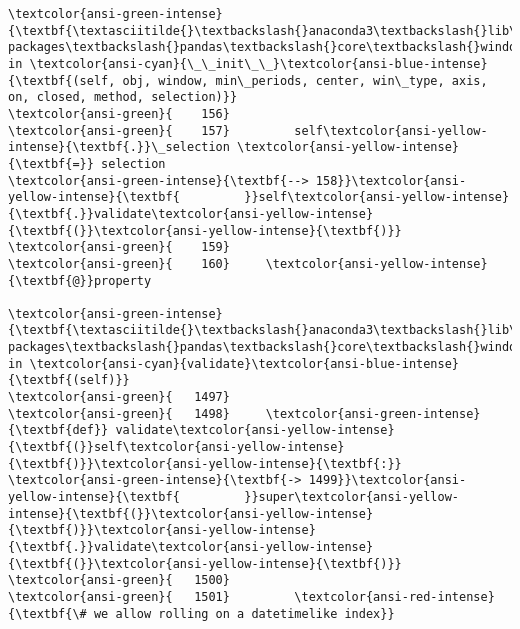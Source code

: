 \documentclass[11pt]{article}
\begin{document}
\begin{Verbatim}[commandchars=\\\{\}, frame=single, framerule=2mm, rulecolor=\color{outerrorbackground}]
\textcolor{ansi-green-intense}{\textbf{\textasciitilde{}\textbackslash{}anaconda3\textbackslash{}lib\textbackslash{}site-packages\textbackslash{}pandas\textbackslash{}core\textbackslash{}window\textbackslash{}rolling.py}} in \textcolor{ansi-cyan}{\_\_init\_\_}\textcolor{ansi-blue-intense}{\textbf{(self, obj, window, min\_periods, center, win\_type, axis, on, closed, method, selection)}}
\textcolor{ansi-green}{    156} 
\textcolor{ansi-green}{    157}         self\textcolor{ansi-yellow-intense}{\textbf{.}}\_selection \textcolor{ansi-yellow-intense}{\textbf{=}} selection
\textcolor{ansi-green-intense}{\textbf{--> 158}}\textcolor{ansi-yellow-intense}{\textbf{         }}self\textcolor{ansi-yellow-intense}{\textbf{.}}validate\textcolor{ansi-yellow-intense}{\textbf{(}}\textcolor{ansi-yellow-intense}{\textbf{)}}
\textcolor{ansi-green}{    159} 
\textcolor{ansi-green}{    160}     \textcolor{ansi-yellow-intense}{\textbf{@}}property

\textcolor{ansi-green-intense}{\textbf{\textasciitilde{}\textbackslash{}anaconda3\textbackslash{}lib\textbackslash{}site-packages\textbackslash{}pandas\textbackslash{}core\textbackslash{}window\textbackslash{}rolling.py}} in \textcolor{ansi-cyan}{validate}\textcolor{ansi-blue-intense}{\textbf{(self)}}
\textcolor{ansi-green}{   1497} 
\textcolor{ansi-green}{   1498}     \textcolor{ansi-green-intense}{\textbf{def}} validate\textcolor{ansi-yellow-intense}{\textbf{(}}self\textcolor{ansi-yellow-intense}{\textbf{)}}\textcolor{ansi-yellow-intense}{\textbf{:}}
\textcolor{ansi-green-intense}{\textbf{-> 1499}}\textcolor{ansi-yellow-intense}{\textbf{         }}super\textcolor{ansi-yellow-intense}{\textbf{(}}\textcolor{ansi-yellow-intense}{\textbf{)}}\textcolor{ansi-yellow-intense}{\textbf{.}}validate\textcolor{ansi-yellow-intense}{\textbf{(}}\textcolor{ansi-yellow-intense}{\textbf{)}}
\textcolor{ansi-green}{   1500} 
\textcolor{ansi-green}{   1501}         \textcolor{ansi-red-intense}{\textbf{\# we allow rolling on a datetimelike index}}


\end{Verbatim}
\end{document}
